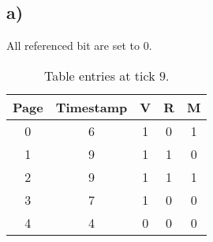 \documentclass[a4paper,11pt]{report}
\begin{document}
\subsection*{a)}

All referenced bit are set to $0$.

  \begin{table}[h]
\centering
\caption{Table entries at tick $9$.}
\label{table:ex3-1}
\begin{tabular}{ccccc}
\hline
\multicolumn{1}{|c|}{\textbf{Page}} & \multicolumn{1}{c|}{\textbf{Timestamp}} & \multicolumn{1}{c|}{\textbf{V}} & \multicolumn{1}{c|}{\textbf{R}} & \multicolumn{1}{c|}{\textbf{M}} \\ \hline
0                                   & 6                                       & 1                               & 0                               & 1                               \\
1                                   & 9                                       & 1                               & 1                               & 0                               \\
2                                   & 9                                       & 1                               & 1                               & 1                               \\
3                                   & 7                                       & 1                               & 0                               & 0                               \\
4                                   & 4                                       & 0                               & 0                               & 0                              
\end{tabular}
\end{table}
\end{document}

